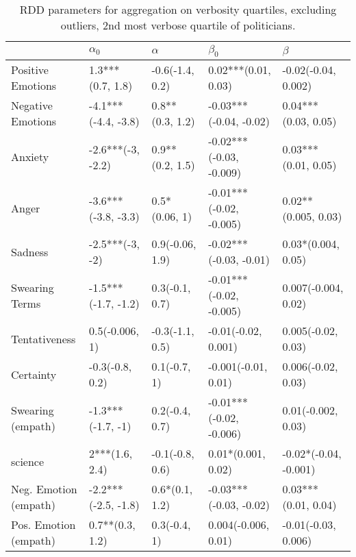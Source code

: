 \begin{table}[h]\centering
\begin{adjustbox}{width=\linewidth, center}
	\begin{tabular}{lllll}
	\toprule
	{} &           $\alpha_0$ &         $\alpha$ &                $\beta_0$ &                $\beta$ \\
	\midrule
	Positive Emotions     &     1.3***(0.7, 1.8) &  -0.6(-1.4, 0.2) &      0.02***(0.01, 0.03) &    -0.02(-0.04, 0.002) \\
	Negative Emotions     &  -4.1***(-4.4, -3.8) &  0.8**(0.3, 1.2) &   -0.03***(-0.04, -0.02) &    0.04***(0.03, 0.05) \\
	Anxiety               &    -2.6***(-3, -2.2) &  0.9**(0.2, 1.5) &  -0.02***(-0.03, -0.009) &    0.03***(0.01, 0.05) \\
	Anger                 &  -3.6***(-3.8, -3.3) &    0.5*(0.06, 1) &  -0.01***(-0.02, -0.005) &    0.02**(0.005, 0.03) \\
	Sadness               &      -2.5***(-3, -2) &  0.9(-0.06, 1.9) &   -0.02***(-0.03, -0.01) &     0.03*(0.004, 0.05) \\
	Swearing Terms        &  -1.5***(-1.7, -1.2) &   0.3(-0.1, 0.7) &  -0.01***(-0.02, -0.005) &    0.007(-0.004, 0.02) \\
	Tentativeness         &       0.5(-0.006, 1) &  -0.3(-1.1, 0.5) &      -0.01(-0.02, 0.001) &     0.005(-0.02, 0.03) \\
	Certainty             &      -0.3(-0.8, 0.2) &     0.1(-0.7, 1) &      -0.001(-0.01, 0.01) &     0.006(-0.02, 0.03) \\
	Swearing (empath)     &    -1.3***(-1.7, -1) &   0.2(-0.4, 0.7) &  -0.01***(-0.02, -0.006) &     0.01(-0.002, 0.03) \\
	science               &       2***(1.6, 2.4) &  -0.1(-0.8, 0.6) &       0.01*(0.001, 0.02) &  -0.02*(-0.04, -0.001) \\
	Neg. Emotion (empath) &  -2.2***(-2.5, -1.8) &   0.6*(0.1, 1.2) &   -0.03***(-0.03, -0.02) &    0.03***(0.01, 0.04) \\
	Pos. Emotion (empath) &      0.7**(0.3, 1.2) &     0.3(-0.4, 1) &      0.004(-0.006, 0.01) &    -0.01(-0.03, 0.006) \\
	\bottomrule
	\end{tabular}
	
\end{adjustbox}
	\caption{RDD parameters for aggregation on verbosity quartiles, excluding outliers, 2nd most verbose quartile of politicians.}
	\label{fig: Verbosity_4}
\end{table}

